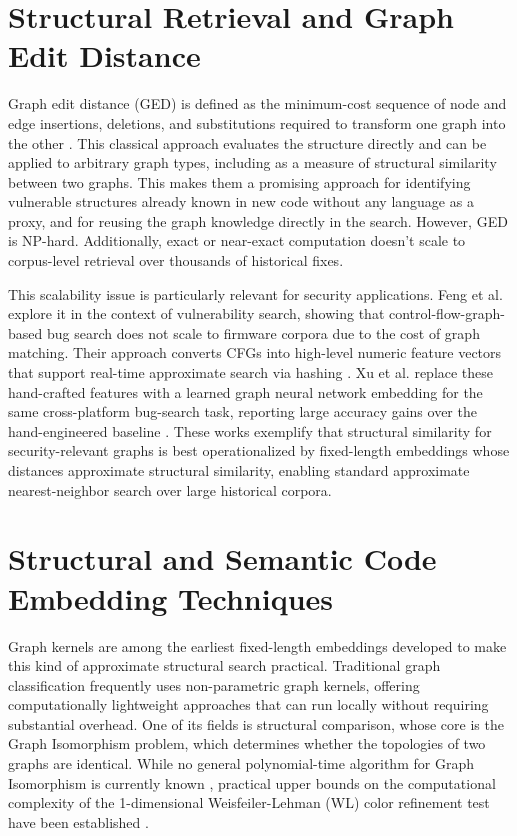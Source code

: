 \section{Structural Retrieval and Graph Edit Distance}
Graph edit distance (GED) is defined as the minimum-cost sequence of node and edge insertions, deletions, and substitutions required to transform one graph into the other \cite{gao2010survey}.
This classical approach evaluates the structure directly and can be applied to arbitrary graph types, including as a measure of structural similarity between two graphs. 
This makes them a promising approach for identifying vulnerable structures already known in new code without any language as a proxy, and for reusing the graph knowledge directly in the search.
However, GED is NP-hard. Additionally, exact or near-exact computation doesn't scale to corpus-level retrieval over thousands of historical fixes. 

This scalability issue is particularly relevant for security applications.
Feng et al. explore it in the context of vulnerability search, showing that control-flow-graph-based bug search does not scale to firmware corpora due to the cost of graph matching. 
Their approach converts CFGs into high-level numeric feature vectors that support real-time approximate search via hashing \cite{feng2016scalable}. 
Xu et al. replace these hand-crafted features with a learned graph neural network embedding for the same cross-platform bug-search task, reporting large accuracy gains over the hand-engineered baseline \cite{xu2017neural}. 
These works exemplify that structural similarity for security-relevant graphs is best operationalized by fixed-length embeddings whose distances approximate structural similarity, enabling standard approximate nearest-neighbor search over large historical corpora.


\section{Structural and Semantic Code Embedding Techniques}

Graph kernels are among the earliest fixed-length embeddings developed to make this kind of approximate structural search practical. 
Traditional graph classification frequently uses non-parametric graph kernels, offering computationally lightweight approaches that can run locally without requiring substantial overhead. 
One of its fields is structural comparison, whose core is the Graph Isomorphism problem, which determines whether the topologies of two graphs are identical. 
While no general polynomial-time algorithm for Graph Isomorphism is currently known \cite{garey1979computers, babai2016graph}, practical upper bounds on the computational complexity of the 1-dimensional Weisfeiler-Lehman (WL) color refinement test have been established \cite{weisfeiler1968reduction}.

